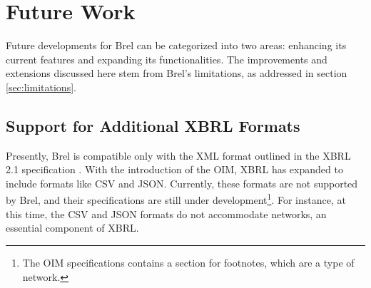 
\section{Future Work}

Future developments for Brel can be categorized into two areas: 
enhancing its current features and expanding its functionalities. 
The improvements and extensions discussed here stem from Brel's limitations, 
as addressed in section \ref{sec:limitations}.



\subsection{Support for Additional XBRL Formats}

Presently, Brel is compatible only with the XML format outlined in the XBRL 2.1 specification \cite{xbrl21}.
With the introduction of the OIM, XBRL has expanded to include formats like CSV and JSON.
Currently, these formats are not supported by Brel, and their specifications are still under development\footnote{The OIM specifications contains a section for footnotes, which are a type of network.}.
For instance, at this time, the CSV and JSON formats do not accommodate networks, an essential component of XBRL.

